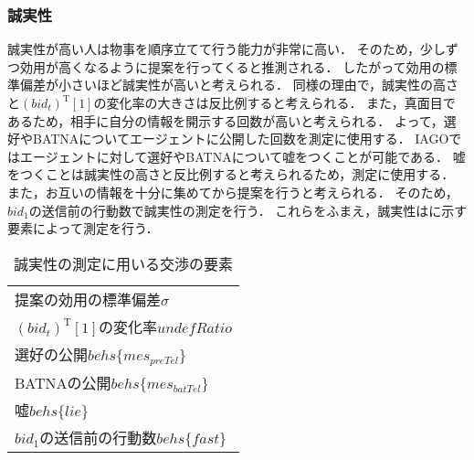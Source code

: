 \subsubsection*{誠実性}
誠実性が高い人は物事を順序立てて行う能力が非常に高い．
そのため，少しずつ効用が高くなるように提案を行ってくると推測される．
したがって効用の標準偏差が小さいほど誠実性が高いと考えられる．
同様の理由で，誠実性の高さと$(bid_t)^{\mathrm{T}}[1]$の変化率の大きさは反比例すると考えられる．
また，真面目であるため，相手に自分の情報を開示する回数が高いと考えられる．
よって，選好やBATNAについてエージェントに公開した回数を測定に使用する．
IAGOではエージェントに対して選好やBATNAについて嘘をつくことが可能である．
嘘をつくことは誠実性の高さと反比例すると考えられるため，測定に使用する．
また，お互いの情報を十分に集めてから提案を行うと考えられる．
そのため，$bid_1$の送信前の行動数で誠実性の測定を行う．
これらをふまえ，誠実性はに示す要素によって測定を行う．

\begin{table}[b]
    \centering
    \caption{誠実性の測定に用いる交渉の要素}
    \begin{tabular}{l} \toprule
        提案の効用の標準偏差$\sigma$ \\
        $(bid_t)^{\mathrm{T}}[1]$の変化率$\mathit{undefRatio}$  \\
        選好の公開$behs\{mes_{\mathit{preTel}}\}$ \\
        BATNAの公開$behs\{mes_{\mathit{batTel}}\}$ \\
        嘘$behs\{lie\}$ \\ 
        $bid_1$の送信前の行動数$behs\{fast\}$ \\ \bottomrule
    \end{tabular}
    \label{tab:conscientiousness}
\end{table}

